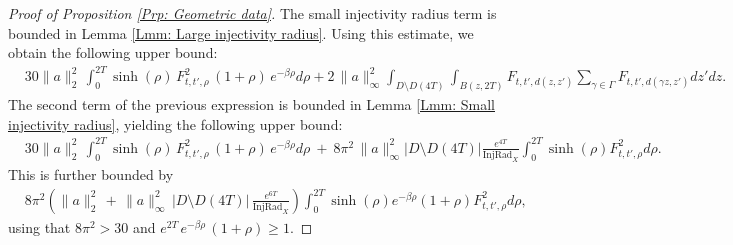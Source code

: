\documentclass[11pt,twoside,reqno]{amsart} \usepackage{a4wide} \usepackage[T1]{fontenc} \usepackage[utf8]{inputenc} \usepackage{soul}  \usepackage{amsmath} \usepackage{amsfonts} \usepackage{amssymb} \usepackage{mathtools} \usepackage{amsthm} \usepackage{xcolor} \usepackage{graphicx} \usepackage{hyperref} \usepackage{standalone} \usepackage{esint} \usepackage{comment} \usepackage[left=2.3cm,top=3cm,right=2.3cm]{geometry} \usepackage{bm} \usepackage{svg} \usepackage{float} \numberwithin{equation}{section} \theoremstyle{plain} \newtheorem{thm}{Theorem}[section] \newtheorem{theorem}[thm]{Theorem} \newtheorem*{theorem*}{Theorem}\newtheorem{conj}[thm]{Conjecture} \newtheorem{lemma}[thm]{Lemma} \newtheorem{prop}[thm]{Proposition} \newtheorem{proposition}[thm]{Proposition} \newtheorem{cor}[thm]{Corollary} \newtheorem{question}[thm]{Question} \newtheorem{corollary}[thm]{Corollary} \newtheorem{assumption}[thm]{Assumption} \theoremstyle{definition} \newtheorem{defn}[thm]{Definition} \newtheorem{choice}[thm]{Choice} \newtheorem{definition}[thm]{Definition} \newtheorem{ex}[thm]{Example} \newtheorem{notation}[thm]{Notation} \newtheorem*{ack}{Acknowledgements} \theoremstyle{remark} \newtheorem{remark}[thm]{Remark} \newtheorem{bigremark}[thm]{Remark} \usepackage{xcolor} \newcommand{\red}[1]{ {\color{Red}#1} } \newcommand{\blue}[1]{ {\color{Blue}#1} } \author{Kai Hippi} \address{Aalto University, Espoo, Finland} \email{kai.hippi@aalto.fi}
\begin{document}
\begin{proof}[Proof of Proposition \ref{Prp: Geometric data}]
The small injectivity radius term is bounded in Lemma \ref{Lmm: Large injectivity radius}. Using this estimate, we obtain the following upper bound:
\begin{align*}
	&
	30 \| a \|_{2}^{2} \, \int_{0}^{2T}  \sinh( \rho ) \, F_{t,t',\rho}^{2} \, ( 1 + \rho ) \, e^{ -\beta \rho } d \rho 
	+ 2 \, \| a \|_{\infty}^{2} \int_{D \setminus D( 4T )} \int_{ B( z, 2T ) }   F_{t,t', d( z,z' )}  \sum_{\gamma \in \Gamma}^{} F_{t,t', d( \gamma z, z' )} dz' dz.
\end{align*}
The second term of the previous expression is bounded in Lemma \ref{Lmm: Small injectivity radius}, yielding the following upper bound:
\begin{align*}
	&
	30 \| a \|_{2}^{2} \, \int_{0}^{2T}  \sinh( \rho ) \, F_{t,t',\rho}^{2} \, ( 1 + \rho ) \, e^{ -\beta  \rho } d \rho 
	\ + \ 8\pi^{2}  \, \| a \|_{\infty}^{2} | D \setminus D( 4T ) | \frac{e^{4T}}{\operatorname{InjRad}_{X}} \int_{0}^{2T} \sinh( \rho ) F_{t,t',\rho}^{2} d\rho.
\end{align*}
This is further bounded by
\begin{align*}
	&
	8 \pi^{2}\left( \| a \|_{2}^{2} \, + \, \| a \|_{\infty}^{2} \, | D \setminus D( 4T ) | \, \frac{ e^{ 6T }}{ \operatorname{InjRad}_{X} } \right) \int_{0}^{2T} \sinh( \rho ) e^{ -\beta \rho} ( 1 + \rho ) F_{t,t',\rho}^{2} d \rho,
\end{align*}
using that $ 8 \pi^{2} > 30 $ and $ e^{ 2T } \, e^{ -\beta \rho } \, ( 1 + \rho ) \geq 1 $.


\end{proof}
\end{document}
